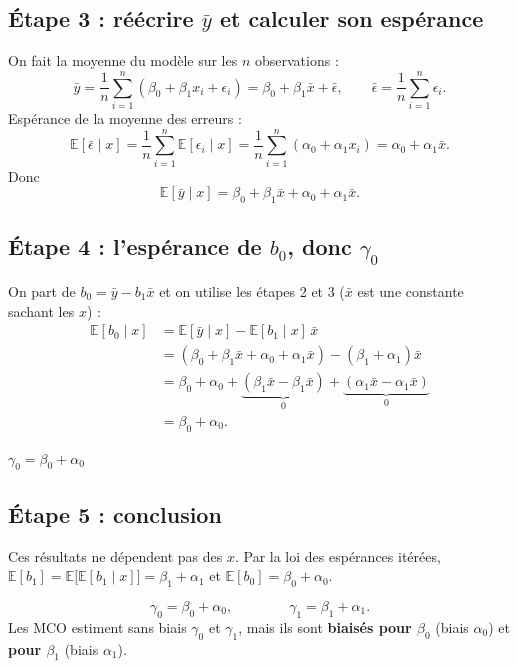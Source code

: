 \documentclass[11pt,a4paper]{article}
\newcommand{\E}{\mathbb{E}}
\newcommand{\sumi}{\sum_{i=1}^{n}}
\begin{document}
\subsection*{Étape 3 : réécrire $\bar y$ et calculer son espérance}

On fait la moyenne du modèle sur les $n$ observations :
\[
\bar y=\frac1n\sumi(\beta_0+\beta_1x_i+\epsilon_i)=\beta_0+\beta_1\bar x+\bar\epsilon,\qquad \bar\epsilon=\frac1n\sumi\epsilon_i .
\]
Espérance de la moyenne des erreurs :
\[
\E[\bar\epsilon\mid x]=\frac1n\sumi\E[\epsilon_i\mid x]=\frac1n\sumi(\alpha_0+\alpha_1x_i)=\alpha_0+\alpha_1\bar x .
\]
Donc
\[
\E[\bar y\mid x]=\beta_0+\beta_1\bar x+\alpha_0+\alpha_1\bar x .
\]

\subsection*{Étape 4 : l'espérance de $b_0$, donc $\gamma_0$}

On part de $b_0=\bar y-b_1\bar x$ et on utilise les étapes 2 et 3 ($\bar x$ est une constante sachant les $x$) :
\begin{align*}
\E[b_0\mid x]&=\E[\bar y\mid x]-\E[b_1\mid x]\,\bar x\\
&=(\beta_0+\beta_1\bar x+\alpha_0+\alpha_1\bar x)-(\beta_1+\alpha_1)\bar x\\
&=\beta_0+\alpha_0+\underbrace{(\beta_1\bar x-\beta_1\bar x)}_{0}+\underbrace{(\alpha_1\bar x-\alpha_1\bar x)}_{0}\\
&=\beta_0+\alpha_0 .
\end{align*}

\begin{resultat}
$\boxed{\gamma_0=\beta_0+\alpha_0}$
\end{resultat}

\subsection*{Étape 5 : conclusion}

Ces résultats ne dépendent pas des $x$. Par la loi des espérances itérées, $\E[b_1]=\E\big[\E[b_1\mid x]\big]=\beta_1+\alpha_1$ et $\E[b_0]=\beta_0+\alpha_0$.

\begin{resultat}[title={Réponse finale}]
\[
\gamma_0=\beta_0+\alpha_0,\qquad\qquad \gamma_1=\beta_1+\alpha_1 .
\]
Les MCO estiment sans biais $\gamma_0$ et $\gamma_1$, mais ils sont \textbf{biaisés pour $\beta_0$} (biais $\alpha_0$) et \textbf{pour $\beta_1$} (biais $\alpha_1$).
\end{resultat}
\end{document}
